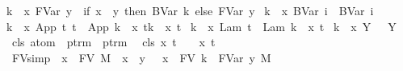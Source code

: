 \begin{isabellebody}
{\isachardoublequoteopen}{\isacharbraceleft}k\ {\isacharless}{\isacharminus}\ x{\isacharbraceright}\ {\isacharparenleft}FVar\ y{\isacharparenright}\ {\isacharequal}\ {\isacharparenleft}if\ x\ {\isacharequal}\ y\ then\ BVar\ k\ else\ FVar\ y{\isacharparenright}{\isachardoublequoteclose}\ {\isacharbar}\isanewline
{\isachardoublequoteopen}{\isacharbraceleft}k\ {\isacharless}{\isacharminus}\ x{\isacharbraceright}\ {\isacharparenleft}BVar\ i{\isacharparenright}\ {\isacharequal}\ BVar\ i{\isachardoublequoteclose}\ {\isacharbar}\isanewline
{\isachardoublequoteopen}{\isacharbraceleft}k\ {\isacharless}{\isacharminus}\ x{\isacharbraceright}\ {\isacharparenleft}App\ t{}\ t{}{\isacharparenright}\ {\isacharequal}\ App\ {\isacharparenleft}{\isacharbraceleft}k\ {\isacharless}{\isacharminus}\ x{\isacharbraceright}\ t{}{\isacharparenright}{\isacharparenleft}{\isacharbraceleft}k\ {\isacharless}{\isacharminus}\ x{\isacharbraceright}\ t{}{\isacharparenright}{\isachardoublequoteclose}\ {\isacharbar}\isanewline
{\isachardoublequoteopen}{\isacharbraceleft}k\ {\isacharless}{\isacharminus}\ x{\isacharbraceright}\ {\isacharparenleft}Lam\ t{\isacharparenright}\ {\isacharequal}\ Lam\ {\isacharparenleft}{\isacharbraceleft}{\isacharparenleft}k{\isacharplus}{}{\isacharparenright}\ {\isacharless}{\isacharminus}\ x{\isacharbraceright}\ t{\isacharparenright}{\isachardoublequoteclose}\ {\isacharbar}\isanewline
{\isachardoublequoteopen}{\isacharbraceleft}k\ {\isacharless}{\isacharminus}\ x{\isacharbraceright}\ {\isacharparenleft}Y\ {\isasymsigma}{\isacharparenright}\ {\isacharequal}\ Y\ {\isasymsigma}{\isachardoublequoteclose}\isanewline
\isanewline
{}\isamarkupfalse%
\ cls{\isacharprime}{\isacharcolon}{\isacharcolon}\ {\isachardoublequoteopen}atom\ {\isasymRightarrow}\ ptrm\ {\isasymRightarrow}\ ptrm{\isachardoublequoteclose}\ {\isacharparenleft}{\isachardoublequoteopen}{\isacharbackslash}{\isacharunderscore}{\isacharcircum}{\isacharunderscore}{\isachardoublequoteclose}{\isacharparenright}\ \isanewline
{\isachardoublequoteopen}cls{\isacharprime}\ x\ t\ {\isasymequiv}\ {\isacharbraceleft}{}\ {\isacharless}{\isacharminus}\ x{\isacharbraceright}\ t{\isachardoublequoteclose}\isanewline
\isanewline
{}\isamarkupfalse%
\ FV{\isacharunderscore}simp{\isacharcolon}\ {\isachardoublequoteopen}{\isasymlbrakk}\ x\ {\isasymnotin}\ FV\ M\ {\isacharsemicolon}\ x\ {\isasymnoteq}\ y\ {\isasymrbrakk}\ {\isasymLongrightarrow}\ x\ {\isasymnotin}\ FV\ {\isacharbraceleft}k\ {\isasymrightarrow}\ FVar\ y{\isacharbraceright}\ M{\isachardoublequoteclose}\isanewline

\end{isabellebody}
